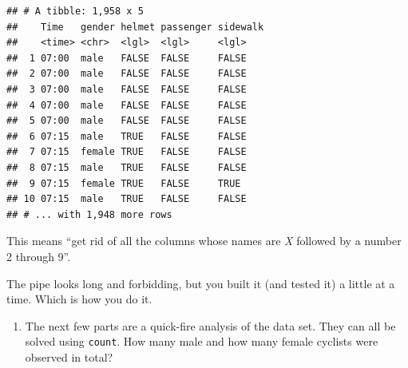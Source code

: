 \documentclass[]{tufte-book}
\newenvironment{Shaded}{}{}
\newcommand{\DataTypeTok}[1]{\textcolor[rgb]{0.56,0.13,0.00}{#1}}
\newcommand{\DecValTok}[1]{\textcolor[rgb]{0.25,0.63,0.44}{#1}}
\newcommand{\KeywordTok}[1]{\textcolor[rgb]{0.00,0.44,0.13}{\textbf{#1}}}
\newcommand{\NormalTok}[1]{#1}
\newcommand{\OperatorTok}[1]{\textcolor[rgb]{0.40,0.40,0.40}{#1}}
\newcommand{\StringTok}[1]{\textcolor[rgb]{0.25,0.44,0.63}{#1}}
\providecommand{\tightlist}{%
  \setlength{\itemsep}{0pt}\setlength{\parskip}{0pt}}
\theoremstyle{definition}
\theoremstyle{definition}
\theoremstyle{definition}
\theoremstyle{remark}
\begin{document}
\begin{Shaded}
\end{Shaded}

\begin{verbatim}
## # A tibble: 1,958 x 5
##    Time   gender helmet passenger sidewalk
##    <time> <chr>  <lgl>  <lgl>     <lgl>   
##  1 07:00  male   FALSE  FALSE     FALSE   
##  2 07:00  male   FALSE  FALSE     FALSE   
##  3 07:00  male   FALSE  FALSE     FALSE   
##  4 07:00  male   FALSE  FALSE     FALSE   
##  5 07:00  male   FALSE  FALSE     FALSE   
##  6 07:15  male   TRUE   FALSE     FALSE   
##  7 07:15  female TRUE   FALSE     FALSE   
##  8 07:15  male   TRUE   FALSE     FALSE   
##  9 07:15  female TRUE   FALSE     TRUE    
## 10 07:15  male   TRUE   FALSE     FALSE   
## # ... with 1,948 more rows
\end{verbatim}

This means ``get rid of all the columns whose names are \emph{X}
followed by a number 2 through 9''.

The pipe looks long and forbidding, but you built it (and tested it) a
little at a time. Which is how you do it.

\begin{enumerate}
\def\labelenumi{(\alph{enumi})}
\setcounter{enumi}{7}
\tightlist
\item
  The next few parts are a quick-fire analysis of the data set. They can
  all be solved using \texttt{count}. How many male and how many female
  cyclists were observed in total?
\end{enumerate}
\end{document}
